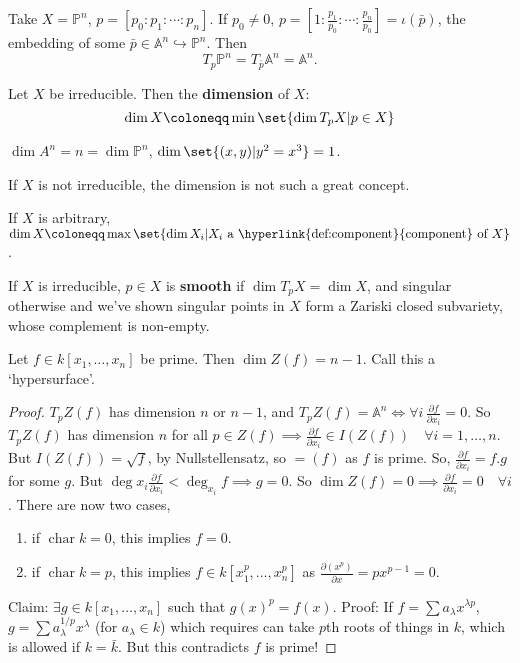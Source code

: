 \documentclass{article}
\newcommand{\A}{\mathbb{A}}
\newcommand{\proj}{\mathbb{P}}
\DeclareMathOperator{\chara}{char}
\begin{document}
\begin{eg}
    Take $X = \proj^n$, $p = [p_0: p_1: \dotsb: p_n]$. If $p_0 \neq 0$, $p = [1: \frac{p_1}{p_0} : \dotsb : \frac{p_n}{p_0}] = \iota(\bar{p})$, the embedding of some $\bar{p} \in \A^n \hookrightarrow \proj^n$. Then
    \begin{equation*}
        T_p \proj^n = T_{\bar{p}} \A^n = \A^n.
    \end{equation*}
\end{eg}
\begin{defi}
    Let $X$ be irreducible. Then the \textbf{dimension} of $X$:
    \begin{equation*}
        \dim X \coloneqq \min \set{\dim T_p X | p \in X}
    \end{equation*}
\end{defi}
\begin{eg}
    $\dim A^n = n = \dim \proj^n$, $\dim \set{(x, y) | y^2 = x^3} = 1$.
\end{eg}
If $X$ is not irreducible, the dimension is not such a great concept.
\begin{defi}
    If $X$ is arbitrary, $\dim X \coloneqq \max\set{\dim X_i | X_i \text{ a \hyperlink{def:component}{component} of } X}$.
\end{defi}
\begin{defi}
    If $X$ is irreducible, $p \in X$ is \textbf{smooth} if $\dim T_p X = \dim X$, and singular otherwise and we've shown singular points in $X$ form a Zariski closed subvariety, whose complement is non-empty. %
\end{defi}
\begin{lemma}
    Let $f \in k[x_1, \dotsc, x_n]$ be prime. Then $\dim Z(f) = n-1$. Call this a `hypersurface'.
\end{lemma}
\begin{proof}
    $T_p Z(f)$ has dimension $n$ or $n-1$, and $T_p Z(f) = \A^n \iff \forall i \, \frac{\partial f}{\partial x_i} = 0$.
    So $T_p Z(f)$ has dimension $n$ for all $p \in Z(f) \implies \frac{\partial f}{\partial x_i} \in I(Z(f)) \quad \forall i=1, \dotsc, n$.
    But $I(Z(f)) = \sqrt{f}$, by Nullstellensatz, so $=(f)$ as $f$ is prime.
    So, $\frac{\partial f}{\partial x_i} = f . g$ for some $g$. But $\deg x_i \frac{\partial f}{\partial x_i} < \deg_{x_i} f \implies g = 0$.
    So $\dim Z(f) = 0 \implies \frac{\partial f}{\partial x_i} = 0 \quad \forall i$.
    There are now two cases,
    \begin{enumerate}[label=(\roman*)]
        \item if $\chara k = 0$, this implies $f = 0$.
        \item if $\chara k = p$, this implies $f \in k[x_1^p, \dotsc, x_n^p]$ as $\frac{\partial (x^p)}{\partial x} = p x^{p-1} = 0$.
    \end{enumerate}
    Claim: $\exists g \in k[x_1, \dotsc, x_n]$ such that $g(x)^p = f(x)$.
    Proof: If $f = \sum a_\lambda x^{\lambda p}$, $g = \sum a_\lambda^{1/p} x^\lambda$ (for $a_\lambda \in k$) which requires can take $p$th roots of things in $k$, which is allowed if $k = \bar{k}$.
    But this contradicts $f$ is prime!
\end{proof}
\end{document}

